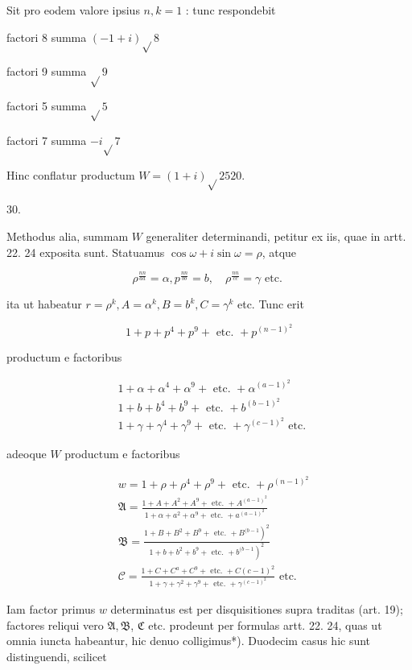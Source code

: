 \documentclass[10pt]{article}
\begin{document}
Sit pro eodem valore ipsius \(n, k=1\) : tunc respondebit

factori 8 summa \((-1+i) \sqrt{ } 8\)

factori 9 summa \(\sqrt{ } 9\)

factori 5 summa \(\sqrt{ } 5\)

factori 7 summa \(-i \sqrt{ } 7\)

Hinc conflatur productum \(W=(1+i) \sqrt{ } 2520\).

30.

Methodus alia, summam \(W\) generaliter determinandi, petitur ex iis, quae in artt. 22. 24 exposita sunt. Statuamus \(\cos \omega+i \sin \omega=\rho\), atque

\[
\rho^{\frac{n n}{a a}}=\alpha, p^{\frac{n n}{b b}}=b, \quad \rho^{\frac{n n}{c c}}=\gamma \text { etc. }
\]

ita ut habeatur \(r=\rho^{k}, A=\alpha^{k}, B=b^{k}, C=\gamma^{k}\) etc. Tunc erit

\[
1+p+p^{4}+p^{9}+\text { etc. }+p^{(n-1)^{2}}
\]

productum e factoribus

\[
\begin{aligned}
& 1+\alpha+\alpha^{4}+\alpha^{9}+\text { etc. }+\alpha^{(a-1)^{2}} \\
& 1+b+b^{4}+b^{9}+\text { etc. }+b^{(b-1)^{2}} \\
& 1+\gamma+\gamma^{4}+\gamma^{9}+\text { etc. }+\gamma^{(c-1)^{2}} \text { etc. }
\end{aligned}
\]

adeoque \(W\) productum e factoribus

\[
\begin{aligned}
& w=1+\rho+\rho^{4}+\rho^{9}+\text { etc. }+\rho^{(n-1)^{2}} \\
& \mathfrak{A}=\frac{1+A+A^{2}+A^{9}+\text { etc. }+A^{(a-1)^{2}}}{1+\alpha+a^{2}+\alpha^{9}+\text { etc. }+a^{(a-1)^{2}}} \\
& \mathfrak{B}=\frac{\left.1+B+B^{2}+B^{9}+\text { etc. }+B^{(b-1}\right)^{2}}{\left.1+b+b^{2}+b^{9}+\text { etc. }+b^{(b-1}\right)^{2}} \\
& \mathscr{C}=\frac{1+C+C^{a}+C^{9}+\text { etc. }+C(c-1)^{2}}{1+\gamma+\gamma^{2}+\gamma^{9}+\text { etc. }+\gamma^{(c-1)^{2}}} \text { etc. }
\end{aligned}
\]

Iam factor primus \(w\) determinatus est per disquisitiones supra traditas (art. 19); factores reliqui vero \(\mathfrak{A}, \mathfrak{B}\), \(\mathfrak{C}\) etc. prodeunt per formulas artt. 22. 24, quas ut omnia iuncta habeantur, hic denuo colligimus*). Duodecim casus hic sunt distinguendi, scilicet
\end{document}
